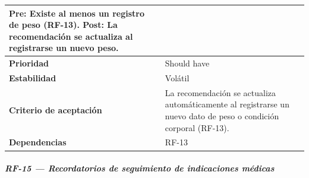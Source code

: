 \documentclass[
]{article}
\begin{document}
{\begin{longtable}[]{|
  >{\raggedright\arraybackslash}p{}|
  >{\raggedright\arraybackslash}p{}|}
\begin{minipage}[t]{\linewidth}
Pre: Existe al menos un registro de peso (RF-13). Post: La recomendación se actualiza al registrarse un nuevo peso.
\end{minipage} \\
\hline
\textbf{Prioridad} & \begin{minipage}[t]{\linewidth}\raggedright
Should have
\end{minipage} \\
\hline
\textbf{Estabilidad} & \begin{minipage}[t]{\linewidth}\raggedright
Volátil
\end{minipage} \\
\hline
\textbf{Criterio de aceptación} &
\begin{minipage}[t]{\linewidth}\raggedright
La recomendación se actualiza automáticamente al registrarse un nuevo dato de peso o condición corporal (RF-13).
\end{minipage} \\
\hline
\textbf{Dependencias} & \begin{minipage}[t]{\linewidth}\raggedright
RF-13
\end{minipage} \\
\hline
\end{longtable}
}

\subparagraph{RF-15 --- Recordatorios de seguimiento de indicaciones médicas}\label{rf-15-recordatorios-de-seguimiento-de-indicaci}
\end{document}
